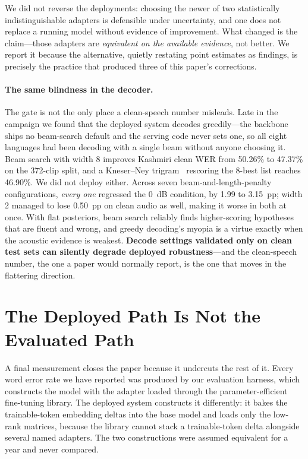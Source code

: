 \documentclass[sigconf,anonymous,review]{acmart}
\begin{document}
We did not reverse the deployments: choosing the newer of two statistically
indistinguishable adapters is defensible under uncertainty, and one does not
replace a running model without evidence of improvement. What changed is the
claim---those adapters are \emph{equivalent on the available evidence}, not
better. We report it because the alternative, quietly restating point estimates
as findings, is precisely the practice that produced three of this paper's
corrections.

\paragraph{The same blindness in the decoder.} The gate is not the only place a
clean-speech number misleads. Late in the campaign we found that the deployed
system decodes greedily---the backbone ships no beam-search default and the
serving code never sets one, so all eight languages had been decoding with a
single beam without anyone choosing it. Beam search with width 8 improves
Kashmiri clean WER from 50.26\% to 47.37\% on the 372-clip split, and a
Kneser--Ney trigram~\cite{kenlm} rescoring the 8-best list reaches 46.90\%. We
did not deploy either. Across seven beam-and-length-penalty configurations,
\emph{every one} regressed the 0~dB condition, by 1.99 to 3.15~pp; width 2
managed to lose 0.50~pp on clean audio as well, making it worse in both at once.
With flat posteriors, beam search reliably finds higher-scoring hypotheses that
are fluent and wrong, and greedy decoding's myopia is a virtue exactly when the
acoustic evidence is weakest. \textbf{Decode settings validated only on clean
test sets can silently degrade deployed robustness}---and the clean-speech
number, the one a paper would normally report, is the one that moves in the
flattering direction.

\section{The Deployed Path Is Not the Evaluated Path}
\label{sec:deployed}

A final measurement closes the paper because it undercuts the rest of it. Every
word error rate we have reported was produced by our evaluation harness, which
constructs the model with the adapter loaded through the parameter-efficient
fine-tuning library. The deployed system constructs it differently: it bakes the
trainable-token embedding deltas into the base model and loads only the low-rank
matrices, because the library cannot stack a trainable-token delta alongside
several named adapters. The two constructions were assumed equivalent for a year
and never compared.
\end{document}
